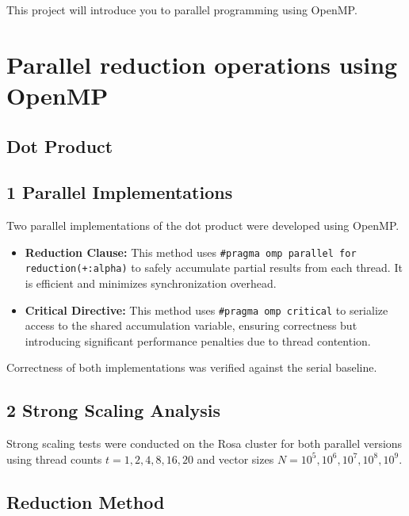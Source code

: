 \documentclass[unicode,11pt,a4paper,oneside,numbers=endperiod,openany]{scrartcl}
\begin{document}
\setassignment

\newline

\assignmentpolicy
This project will introduce you to parallel programming using OpenMP. 

\section{Parallel reduction operations using OpenMP }

\subsection{Dot Product}
\subsection*{1 Parallel Implementations}

Two parallel implementations of the dot product were developed using OpenMP.

\begin{itemize}
    \item \textbf{Reduction Clause:} This method uses \texttt{\#pragma omp parallel for reduction(+:alpha)} to safely accumulate partial results from each thread. It is efficient and minimizes synchronization overhead.
    
    \item \textbf{Critical Directive:} This method uses \texttt{\#pragma omp critical} to serialize access to the shared accumulation variable, ensuring correctness but introducing significant performance penalties due to thread contention.
\end{itemize}

Correctness of both implementations was verified against the serial baseline.

\subsection*{2 Strong Scaling Analysis}

Strong scaling tests were conducted on the Rosa cluster for both parallel versions using thread counts $t = 1, 2, 4, 8, 16, 20$ and vector sizes $N = 10^5, 10^6, 10^7, 10^8, 10^9$.

\subsection*{Reduction Method}
\end{document}
